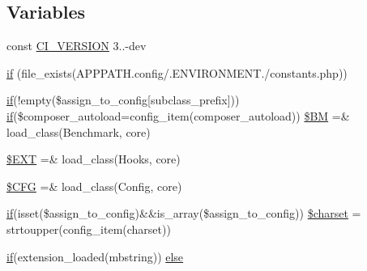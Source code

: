\subsection*{Variables}
\begin{DoxyCompactItemize}
\item 
const \hyperlink{system_2core_2_code_igniter_8php_a32e3c3927ba8ec93df92327dfd85d564}{C\+I\+\_\+\+V\+E\+R\+S\+I\+O\+N} \textquotesingle{}3..-\/dev\textquotesingle{}
\item 
\hyperlink{system_2core_2_code_igniter_8php_a6503a8f8da73cafe64ad07639c198f54}{if} (file\+\_\+exists(A\+P\+P\+P\+A\+T\+H.\textquotesingle{}config/\textquotesingle{}.E\+N\+V\+I\+R\+O\+N\+M\+E\+N\+T.\textquotesingle{}/constants.\+php\textquotesingle{}))
\item 
\hyperlink{_admin_2assets_2js_2bootstrap_8min_8js_a87cf461060832b8b68a7b48d9e371e4f}{if}(!empty(\$assign\+\_\+to\+\_\+config\mbox{[}\textquotesingle{}subclass\+\_\+prefix\textquotesingle{}\mbox{]})) \hyperlink{_admin_2assets_2js_2bootstrap_8min_8js_a87cf461060832b8b68a7b48d9e371e4f}{if}(\$composer\+\_\+autoload=config\+\_\+item(\textquotesingle{}composer\+\_\+autoload\textquotesingle{})) \hyperlink{system_2core_2_code_igniter_8php_a3efe5c22835162259cd530154490ade3}{\$\+B\+M} =\& load\+\_\+class(\textquotesingle{}Benchmark\textquotesingle{}, \textquotesingle{}core\textquotesingle{})
\item 
\hyperlink{system_2core_2_code_igniter_8php_ab97aae9bc0aae04b84d360a29a3c035b}{\$\+E\+X\+T} =\& load\+\_\+class(\textquotesingle{}Hooks\textquotesingle{}, \textquotesingle{}core\textquotesingle{})
\item 
\hyperlink{system_2core_2_code_igniter_8php_adb9373e11e42b2cd55d1fe249ae72deb}{\$\+C\+F\+G} =\& load\+\_\+class(\textquotesingle{}Config\textquotesingle{}, \textquotesingle{}core\textquotesingle{})
\item 
\hyperlink{_admin_2assets_2js_2bootstrap_8min_8js_a87cf461060832b8b68a7b48d9e371e4f}{if}(isset(\$assign\+\_\+to\+\_\+config)\&\&is\+\_\+array(\$assign\+\_\+to\+\_\+config)) \hyperlink{system_2core_2_code_igniter_8php_acf3a97185c56fefd63af2d2af8676bd9}{\$charset} = strtoupper(config\+\_\+item(\textquotesingle{}charset\textquotesingle{}))
\item 
\hyperlink{_admin_2assets_2js_2bootstrap_8min_8js_a87cf461060832b8b68a7b48d9e371e4f}{if}(extension\+\_\+loaded(\textquotesingle{}mbstring\textquotesingle{})) \hyperlink{system_2core_2_code_igniter_8php_ac5109000d551293e102a2bc06f29cda4}{else}
\item 

\end{DoxyCompactItemize}
